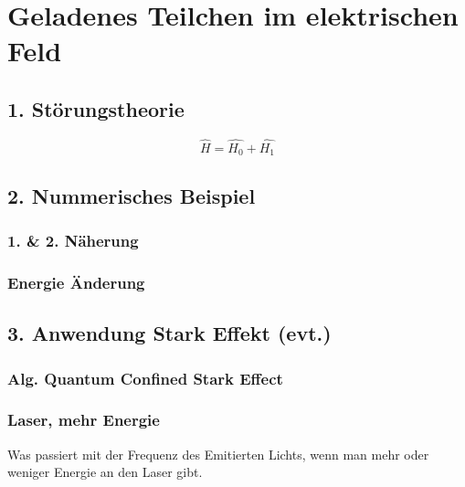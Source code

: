 \chapter{Geladenes Teilchen im elektrischen Feld\label{chapter:efeld}}
\begin{refsection}

\section{ 1. St\"orungstheorie }

\[
\hat{H} = \hat{H_0} + \hat{H_1}
\]



\section{ 2. Nummerisches Beispiel }

\subsection{ 1. \& 2. N\"aherung }

\subsection{ Energie \"Anderung }

\section{ 3. Anwendung Stark Effekt (evt.) }

\subsection{ Alg. Quantum Confined Stark Effect }

\subsection{ Laser, mehr Energie }
Was passiert mit der Frequenz des Emitierten Lichts, wenn man mehr oder weniger Energie an den Laser gibt.

\printbibliography[heading=subbibliography]
\end{refsection}
